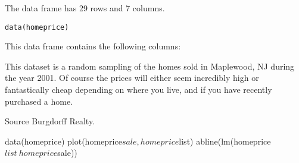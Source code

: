 \begin{Description}\relax
The  data frame has 29 rows and 7 columns.
\end{Description}
\begin{Usage}
\begin{verbatim}data(homeprice)\end{verbatim}
\end{Usage}
\begin{Format}\relax
This data frame contains the following columns:
\end{Format}
\begin{Details}\relax
This dataset is a random sampling of the homes sold in Maplewood, NJ
during the year 2001. Of course the prices will either seem incredibly
high or fantastically cheap depending on where you live, and if you
have recently purchased a home.
\end{Details}
\begin{Source}\relax
Source Burgdorff Realty.
\end{Source}
\begin{Examples}
\begin{ExampleCode}
data(homeprice)
plot(homeprice$sale,homeprice$list)
abline(lm(homeprice$list~homeprice$sale))
\end{ExampleCode}
\end{Examples}

